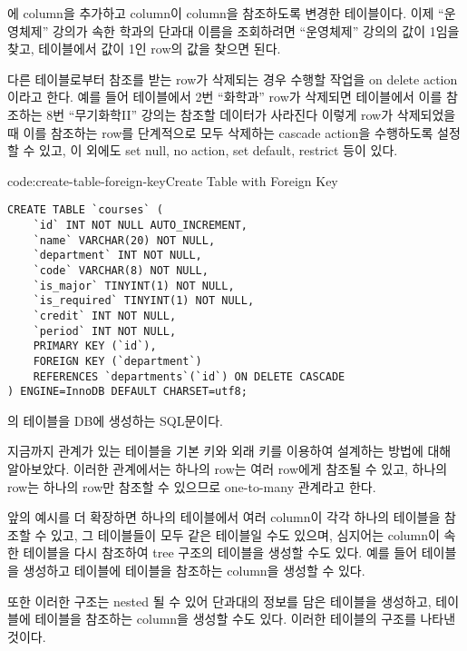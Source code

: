 \는 에  column을 추가하고  column이  column을 참조하도록 변경한 테이블이다. 이제 ``운영체제'' 강의가 속한 학과의 단과대 이름을 조회하려면 ``운영체제'' 강의의  값이 1임을 찾고,  테이블에서  값이 1인 row의  값을 찾으면 된다.

다른 테이블로부터 참조를 받는 row가 삭제되는 경우 수행할 작업을 on delete action이라고 한다. 예를 들어  테이블에서 2번 ``화학과'' row가 삭제되면  테이블에서 이를 참조하는 8번 ``무기화학II'' 강의는 참조할 데이터가 사라진다 이렇게 row가 삭제되었을 때 이를 참조하는 row를 단계적으로 모두 삭제하는 cascade action을 수행하도록 설정할 수 있고, 이 외에도 set null, no action, set default, restrict 등이 있다.

\begin{code}{code:create-table-foreign-key}{Create  Table with Foreign Key}
\begin{verbatim}
CREATE TABLE `courses` (
    `id` INT NOT NULL AUTO_INCREMENT,
    `name` VARCHAR(20) NOT NULL,
    `department` INT NOT NULL,
    `code` VARCHAR(8) NOT NULL,
    `is_major` TINYINT(1) NOT NULL,
    `is_required` TINYINT(1) NOT NULL,
    `credit` INT NOT NULL,
    `period` INT NOT NULL,
    PRIMARY KEY (`id`),
    FOREIGN KEY (`department`)
    REFERENCES `departments`(`id`) ON DELETE CASCADE
) ENGINE=InnoDB DEFAULT CHARSET=utf8;
\end{verbatim}
\end{code}

\는 의 테이블을 DB에 생성하는 SQL문이다.

지금까지 관계가 있는 테이블을 기본 키와 외래 키를 이용하여 설계하는 방법에 대해 알아보았다. 이러한 관계에서는 하나의  row는 여러  row에게 참조될 수 있고, 하나의  row는 하나의  row만 참조할 수 있으므로 one-to-many 관계라고 한다.

앞의 예시를 더 확장하면 하나의 테이블에서 여러 column이 각각 하나의 테이블을 참조할 수 있고, 그 테이블들이 모두 같은 테이블일 수도 있으며, 심지어는 column이 속한 테이블을 다시 참조하여 tree 구조의 테이블을 생성할 수도 있다. 예를 들어  테이블을 생성하고  테이블에  테이블을 참조하는  column을 생성할 수 있다.

또한 이러한 구조는 nested 될 수 있어 단과대의 정보를 담은  테이블을 생성하고,  테이블에  테이블을 참조하는 column을 생성할 수도 있다. \은 이러한  테이블의 구조를 나타낸 것이다.

